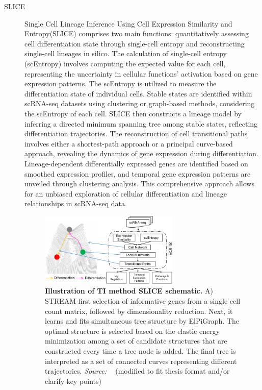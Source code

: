 \begin{description}
    \item[SLICE]
    Single Cell Lineage Inference Using Cell Expression Similarity and Entropy(SLICE) \citep{guo2017slice} comprises two main functions: quantitatively assessing cell differentiation state through single-cell entropy and reconstructing single-cell lineages in silico. The calculation of single-cell entropy (scEntropy) involves computing the expected value for each cell, representing the uncertainty in cellular functions' activation based on gene expression patterns. The scEntropy is utilized to measure the differentiation state of individual cells. Stable states are identified within scRNA-seq datasets using clustering or graph-based methods, considering the scEntropy of each cell. SLICE then constructs a lineage model by inferring a directed minimum spanning tree among stable states, reflecting differentiation trajectories. The reconstruction of cell transitional paths involves either a shortest-path approach or a principal curve-based approach, revealing the dynamics of gene expression during differentiation. Lineage-dependent differentially expressed genes are identified based on smoothed expression profiles, and temporal gene expression patterns are unveiled through clustering analysis. This comprehensive approach allows for an unbiased exploration of cellular differentiation and lineage relationships in scRNA-seq data.
    \begin{figure}[ht!]
    	\centering
    	\includegraphics[width=0.65\textwidth]{TI_Alg_SLICE/fig}
    	\vspace{0.1cm}
    	\caption[Illustration of TI method SLICE schematic.]{\textbf{Illustration of TI method SLICE schematic.} 
    	A)  STREAM first selection of informative genes from a single cell count matrix, followed by dimensionality reduction. Next, it learns and fits simultaneous tree structure by ElPiGraph. The optimal structure is selected based on the elastic energy minimization among a set of candidate structures that are constructed every time a tree node is added. The final tree is interpreted as a set of connected curves representing different trajectories. \emph{Source: ~\cite{guo2017slice}} (modified to fit thesis format and/or clarify key points)
    	}
    	\label{fig:TI_Alg_SLICE}
    \end{figure}


\end{description}
